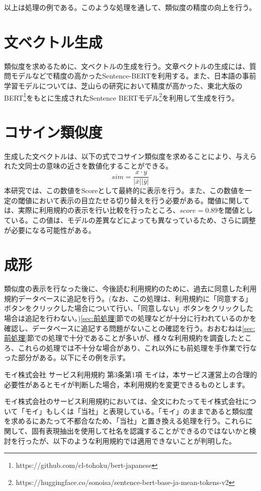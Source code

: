 以上は処理の例である。このような処理を通して、類似度の精度の向上を行う。

\section{文ベクトル生成}
類似度を求めるために、文ベクトルの生成を行う。文章ベクトルの生成には、質問モデルなどで精度の高かったSentence-BERTを利用する。また、日本語の事前学習モデルについては、芝山ら\cite{shibayama-shinnou-2021-construction}の研究において精度が高かった、東北大版のBERT\footnote{https://github.com/cl-tohoku/bert-japanese}をもとに生成されたSentence BERTモデル\footnote{https://huggingface.co/sonoisa/sentence-bert-base-ja-mean-tokens-v2}を利用して生成を行う。

\section{コサイン類似度}
生成した文ベクトルは、以下の式でコサイン類似度を求めることにより、与えられた文同士の意味の近さを数値化することができる。
$$sim = \frac{x\cdot y}{|\bar{x}||\bar{y}|}$$
本研究では、この数値をScoreとして最終的に表示を行う。また、この数値を一定の閾値において表示の目立たせる切り替えを行う必要がある。閾値に関しては、実際に利用規約の表示を行い比較を行ったところ、$score=0.89$を閾値としている。この値は、モデルの差異などによっても異なっているため、さらに調整が必要になる可能性がある。

\section{成形}
\label{sec:成形}
類似度の表示を行なった後に、今後読む利用規約のために、過去に同意した利用規約データベースに追記を行う。(なお、この処理は、利用規約に「同意する」ボタンをクリックした場合について行い、「同意しない」ボタンをクリックした場合は追記を行わない。)\ref{sec:前処理}節での処理などが十分に行われているのかを確認し、データベースに追記する問題がないことの確認を行う。おおむねは\ref{sec:前処理}節での処理で十分であることが多いが、様々な利用規約を調査したところ、これらの処理では不十分な場合があり、これ以外にも前処理を手作業で行なった部分がある。以下にその例を示す。

\begin{itembox}[l]{モイ株式会社 サービス利用規約 第3条第1項}
  モイは，本サービス運営上の合理的必要性があるとモイが判断した場合，本利用規約を変更できるものとします。
\end{itembox}  

モイ株式会社のサービス利用規約においては、全文にわたってモイ株式会社について「モイ」もしくは「当社」と表現している。「モイ」のままであると類似度を求めるにあたって不都合なため、「当社」と置き換える処理を行う。これらに関して、固有表現抽出を使用して社名を認識することができるのではないかと検討を行ったが、以下のような利用規約では適用できないことが判明した。

